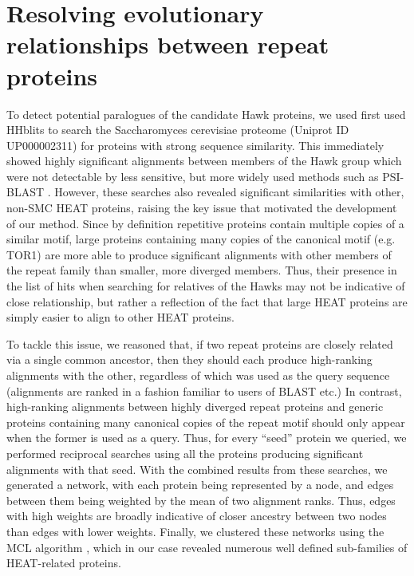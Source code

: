 \documentclass[a4paper,11pt,twoside,openright]{scrbook}
\begin{document}
\section{Resolving evolutionary relationships between repeat proteins}
To detect potential paralogues of the candidate Hawk proteins, we used first used HHblits to search the Saccharomyces cerevisiae proteome (Uniprot ID UP000002311) for proteins with strong sequence similarity. This immediately showed highly significant alignments between members of the Hawk group which were not detectable by less sensitive, but more widely used methods such as PSI-BLAST \cite{Altschul1997}. However, these searches also revealed significant similarities with other, non-SMC HEAT proteins, raising the key issue that motivated the development of our method. Since by definition repetitive proteins contain multiple copies of a similar motif, large proteins containing many copies of the canonical motif (e.g. TOR1) are more able to produce significant alignments with other members of the repeat family than smaller, more diverged members. Thus, their presence in the list of hits when searching for relatives of the Hawks may not be indicative of close relationship, but rather a reflection of the fact that large HEAT proteins are simply easier to align to other HEAT proteins.

To tackle this issue, we reasoned that, if two repeat proteins are closely related via a single common ancestor, then they should each produce high-ranking alignments with the other, regardless of which was used as the query sequence (alignments are ranked in a fashion familiar to users of BLAST etc.) In contrast, high-ranking alignments between highly diverged repeat proteins and generic proteins containing many canonical copies of the repeat motif should only appear when the former is used as a query. Thus, for every “seed” protein we queried, we performed reciprocal searches using all the proteins producing significant alignments with that seed. With the combined results from these searches, we generated a network, with each protein being represented by a node, and edges between them being weighted by the mean of two alignment ranks. Thus, edges with high weights are broadly indicative of closer ancestry between two nodes than edges with lower weights. Finally, we clustered these networks using the MCL algorithm \cite{VanDongen2000}, which in our case revealed numerous well defined sub-families of HEAT-related proteins.
\end{document}
